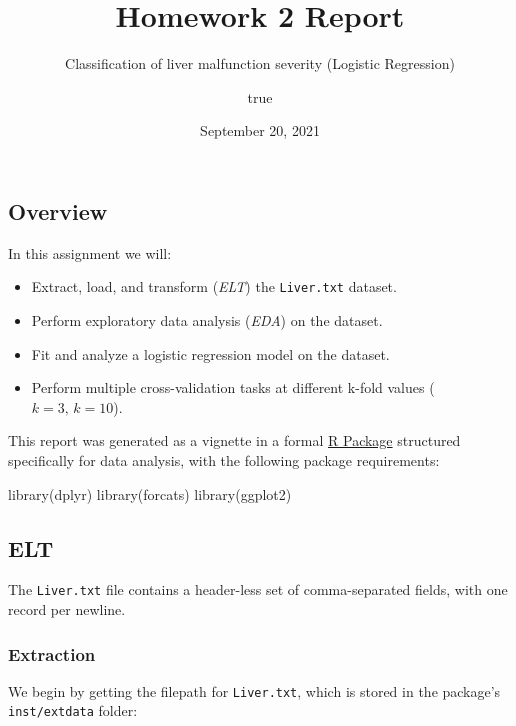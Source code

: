 \documentclass[
  11pt,
  a4paper,
]{scrartcl}
\title{Homework 2 Report}
\subtitle{Classification of liver malfunction severity (Logistic
Regression)}
\author{true}
\date{September 20, 2021}
\newenvironment{Shaded}{\begin{snugshade}}{\end{snugshade}}
\newcommand{\FunctionTok}[1]{\textcolor[rgb]{0.00,0.00,0.00}{#1}}
\newcommand{\NormalTok}[1]{#1}
\providecommand{\tightlist}{%
  \setlength{\itemsep}{0pt}\setlength{\parskip}{0pt}}
\begin{document}
\maketitle

{
\hypersetup{linkcolor=blue}
\setcounter{tocdepth}{3}
\tableofcontents
}
\hypertarget{overview}{%
\subsection{Overview}\label{overview}}

In this assignment we will:

\begin{itemize}
\tightlist
\item
  Extract, load, and transform (\emph{ELT}) the \texttt{Liver.txt}
  dataset.
\item
  Perform exploratory data analysis (\emph{EDA}) on the dataset.
\item
  Fit and analyze a logistic regression model on the dataset.
\item
  Perform multiple cross-validation tasks at different k-fold values
  (\(k = 3,\, k = 10\)).
\end{itemize}

This report was generated as a vignette in a formal
\href{https://r-pkgs.org/intro.html}{R Package} structured specifically
for data analysis, with the following package requirements:

\begin{Shaded}
\begin{Highlighting}[]
\FunctionTok{library}\NormalTok{(dplyr)}
\FunctionTok{library}\NormalTok{(forcats)}
\FunctionTok{library}\NormalTok{(ggplot2)}
\end{Highlighting}
\end{Shaded}

\hypertarget{elt}{%
\subsection{ELT}\label{elt}}

The \texttt{Liver.txt} file contains a header-less set of
comma-separated fields, with one record per newline.

\hypertarget{extraction}{%
\subsubsection{Extraction}\label{extraction}}

We begin by getting the filepath for \texttt{Liver.txt}, which is stored
in the package's \texttt{inst/extdata} folder:
\end{document}
